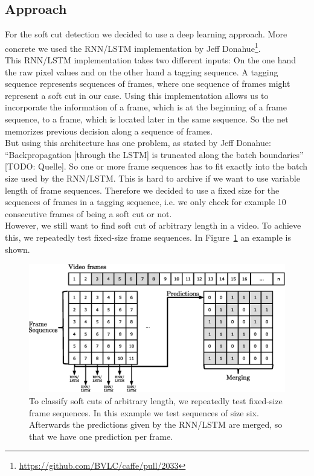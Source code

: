 \subsection{Approach}
\label{sec:soft_cut_approach}

For the soft cut detection we decided to use a deep learning approach.
More concrete we used the RNN/LSTM implementation by Jeff Donahue\footnote{\url{https://github.com/BVLC/caffe/pull/2033}}. \\
This RNN/LSTM implementation takes two different inputs: On the one hand the raw pixel values and on the other hand a tagging sequence.
A tagging sequence represents sequences of frames, where one sequence of frames might represent a soft cut in our case.
Using this implementation allows us to incorporate the information of a frame, which is at the beginning of a frame sequence, to a frame, which is located later in the same sequence.
So the net memorizes previous decision along a sequence of frames. \\
But using this architecture has one problem, as stated by Jeff Donahue: ``Backpropagation [through the LSTM] is truncated along the batch boundaries'' [TODO: Quelle].
So one or more frame sequences has to fit exactly into the batch size used by the RNN/LSTM.
This is hard to archive if we want to use variable length of frame sequences.
Therefore we decided to use a fixed size for the sequences of frames in a tagging sequence, i.e. we only check for example 10 consecutive frames of being a soft cut or not.  \\
However, we still want to find soft cut of arbitrary length in a video.
To achieve this, we repeatedly test fixed-size frame sequences.
In Figure~\ref{fig:soft_cut_approach} an example is shown.
\begin{figure}[!htb]
	\centering
	\includegraphics[scale=.7]{images/soft_cut_approach.eps}
	\caption{To classify soft cuts of arbitrary length, we repeatedly test fixed-size frame sequences. In this example we test sequences of size six. Afterwards the predictions given by the RNN/LSTM are merged, so that we have one prediction per frame.}
	\label{fig:soft_cut_approach}
\end{figure}
